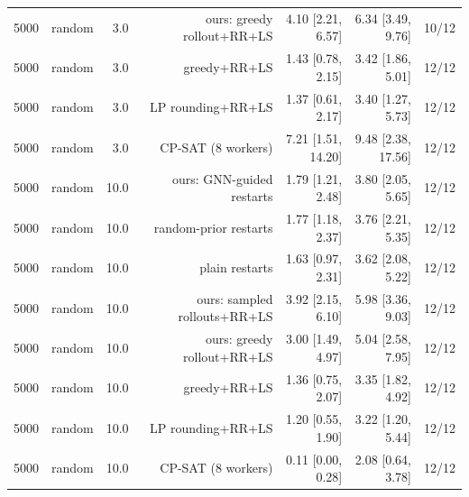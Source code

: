 \begin{table}[t]
\begin{tabular}{llrrrrr}
5000 & random & 3.0 & ours: greedy rollout+RR+LS & 4.10 [2.21, 6.57] & 6.34 [3.49, 9.76] & 10/12 \\
5000 & random & 3.0 & greedy+RR+LS & 1.43 [0.78, 2.15] & 3.42 [1.86, 5.01] & 12/12 \\
5000 & random & 3.0 & LP rounding+RR+LS & 1.37 [0.61, 2.17] & 3.40 [1.27, 5.73] & 12/12 \\
5000 & random & 3.0 & CP-SAT (8 workers) & 7.21 [1.51, 14.20] & 9.48 [2.38, 17.56] & 12/12 \\
5000 & random & 10.0 & ours: GNN-guided restarts & 1.79 [1.21, 2.48] & 3.80 [2.05, 5.65] & 12/12 \\
5000 & random & 10.0 & random-prior restarts & 1.77 [1.18, 2.37] & 3.76 [2.21, 5.35] & 12/12 \\
5000 & random & 10.0 & plain restarts & 1.63 [0.97, 2.31] & 3.62 [2.08, 5.22] & 12/12 \\
5000 & random & 10.0 & ours: sampled rollouts+RR+LS & 3.92 [2.15, 6.10] & 5.98 [3.36, 9.03] & 12/12 \\
5000 & random & 10.0 & ours: greedy rollout+RR+LS & 3.00 [1.49, 4.97] & 5.04 [2.58, 7.95] & 12/12 \\
5000 & random & 10.0 & greedy+RR+LS & 1.36 [0.75, 2.07] & 3.35 [1.82, 4.92] & 12/12 \\
5000 & random & 10.0 & LP rounding+RR+LS & 1.20 [0.55, 1.90] & 3.22 [1.20, 5.44] & 12/12 \\
5000 & random & 10.0 & CP-SAT (8 workers) & 0.11 [0.00, 0.28] & 2.08 [0.64, 3.78] & 12/12 \\
\bottomrule
\end{tabular}
\end{table}
